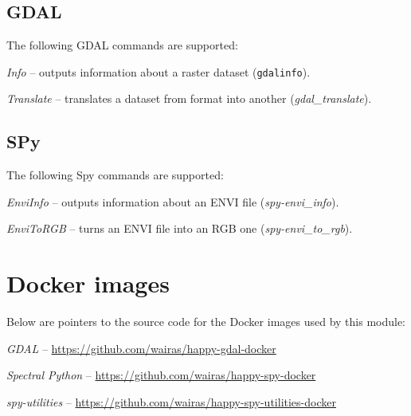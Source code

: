 \documentclass[a4paper]{book}
\begin{document}
\section{GDAL}
The following GDAL commands are supported:
\begin{tight_itemize}
  \item \textit{Info} -- outputs information about a raster dataset (\texttt{gdalinfo}).
  \item \textit{Translate} -- translates a dataset from format into another (\textit{gdal\_translate}).
\end{tight_itemize}


\section{SPy}
The following Spy commands are supported:
\begin{tight_itemize}
  \item \textit{EnviInfo} -- outputs information about an ENVI file (\textit{spy-envi\_info}).
  \item \textit{EnviToRGB} -- turns an ENVI file into an RGB one (\textit{spy-envi\_to\_rgb}).
\end{tight_itemize}


\chapter{Docker images}
Below are pointers to the source code for the Docker images used by this module:
\begin{tight_itemize}
  \item \textit{GDAL} -- \url{https://github.com/wairas/happy-gdal-docker}{}
  \item \textit{Spectral Python} -- \url{https://github.com/wairas/happy-spy-docker}{}
  \item \textit{spy-utilities} -- \url{https://github.com/wairas/happy-spy-utilities-docker}{}
\end{tight_itemize}


\end{document}
